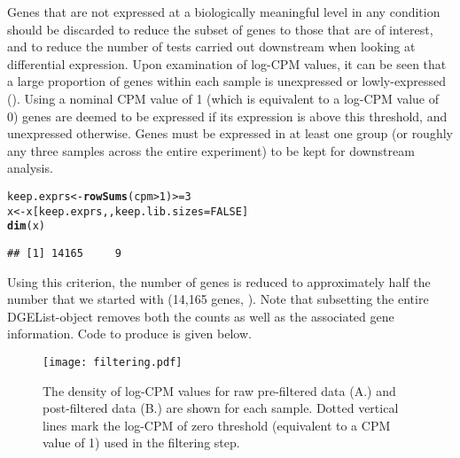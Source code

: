 \documentclass[10pt,a4paper]{extarticle}\usepackage[]{graphicx}\usepackage[]{color}
\makeatletter
\newcommand{\hlnum}[1]{\textcolor[rgb]{0.686,0.059,0.569}{#1}}%
\newcommand{\hlopt}[1]{\textcolor[rgb]{0,0,0}{#1}}%
\newcommand{\hlstd}[1]{\textcolor[rgb]{0.345,0.345,0.345}{#1}}%
\newcommand{\hlkwb}[1]{\textcolor[rgb]{0.69,0.353,0.396}{#1}}%
\newcommand{\hlkwc}[1]{\textcolor[rgb]{0.333,0.667,0.333}{#1}}%
\newcommand{\hlkwd}[1]{\textcolor[rgb]{0.737,0.353,0.396}{\textbf{#1}}}%
\newenvironment{kframe}{%
 \def\at@end@of@kframe{}%
 \ifinner\ifhmode%
  \def\at@end@of@kframe{\end{minipage}}%
  \begin{minipage}{\columnwidth}%
 \fi\fi%
 \def\FrameCommand##1{\hskip\@totalleftmargin \hskip-\fboxsep
 \colorbox{shadecolor}{##1}\hskip-\fboxsep
     \hskip-\linewidth \hskip-\@totalleftmargin \hskip\columnwidth}%
 \MakeFramed {\advance\hsize-\width
   \@totalleftmargin\z@ \linewidth\hsize
   \@setminipage}}%
 {\par\unskip\endMakeFramed%
 \at@end@of@kframe}
\newenvironment{knitrout}{}{} %
\makeatother
\begin{document}
Genes that are not expressed at a biologically meaningful level in any condition should be discarded to reduce the subset of genes to those that are of interest, and to reduce the number of tests carried out downstream when looking at differential expression.
Upon examination of log-CPM values, it can be seen that a large proportion of genes within each sample is unexpressed or lowly-expressed ({}). Using a nominal CPM value of 1 (which is equivalent to a log-CPM value of 0) genes are deemed to be expressed if its expression is above this threshold, and unexpressed otherwise. Genes must be expressed in at least one group (or roughly any three samples across the entire experiment) to be kept for downstream analysis. 
\begin{knitrout}
\color{fgcolor}\begin{kframe}
\begin{alltt}
\hlstd{keep.exprs} \hlkwb{<-} \hlkwd{rowSums}\hlstd{(cpm}\hlopt{>}\hlnum{1}\hlstd{)}\hlopt{>=}\hlnum{3}
\hlstd{x} \hlkwb{<-} \hlstd{x[keep.exprs,,} \hlkwc{keep.lib.sizes}\hlstd{=}\hlnum{FALSE}\hlstd{]}
\hlkwd{dim}\hlstd{(x)}
\end{alltt}
\begin{verbatim}
## [1] 14165     9
\end{verbatim}
\end{kframe}
\end{knitrout}

Using this criterion, the number of genes is reduced to approximately half the number that we started with (14,165 genes, {}). Note that subsetting the entire DGEList-object removes both the counts as well as the associated gene information. Code to produce {} is given below.
\begin{figure}
\centering
\texttt{[image: filtering.pdf]}
\caption{\label{fig:filter}The density of log-CPM values for raw pre-filtered data (A.) and post-filtered data (B.) are shown for each sample. Dotted vertical lines mark the log-CPM of zero threshold (equivalent to a CPM value of 1) used in the filtering step.}
\end{figure}

\end{document}
